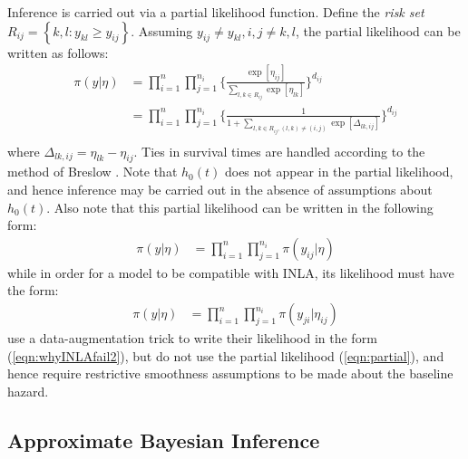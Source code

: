\documentclass[]{article}
\begin{document}
Inference is carried out via a partial likelihood function. Define the \textit{risk set} $R_{ij} = \left\{k,l : y_{kl} \geq y_{ij}\right\}$. Assuming $y_{ij} \neq y_{kl}, i,j \neq k,l$, the partial likelihood can be written as follows: 
\begin{equation}\begin{aligned}\label{eqn:partial}
\pi(y|\eta) &= \prod_{i=1}^{n}\prod_{j=1}^{n_{i}} \bigg\{\frac{\exp[\eta_{ij}]}{{\sum_{l,k\in R_{ij}}^{}\exp[\eta_{lk}]}}\bigg \}^{d_{ij}} \\
&= \prod_{i=1}^{n}\prod_{j=1}^{n_{i}} \bigg\{\frac{1}{{1 + \sum_{l,k\in R_{ij} , (l,k) \neq (i,j)}\exp[\Delta_{lk,ij}]}}\bigg \}^{d_{ij}} \\
\end{aligned}\end{equation}
where $\Delta_{lk,ij} = \eta_{lk} - \eta_{ij}$. Ties in survival times are handled according to the method of Breslow \citep{Breslow}. Note that $h_{0}(t)$ does not appear in the partial likelihood, and hence inference may be carried out in the absence of assumptions about $h_{0}(t)$. Also note that this partial likelihood can be written in the following form:
\begin{equation}\begin{aligned}\label{eqn:whyINLAfail1}
\pi(y|\eta) &= \prod_{i=1}^{n}\prod_{j=1}^{n_{i}} \pi(y_{ij}|\eta)
\end{aligned}\end{equation}
while in order for a model to be compatible with INLA, its likelihood must have the form:
\begin{equation}\begin{aligned}\label{eqn:whyINLAfail2}
\pi(y|\eta) &= \prod_{i=1}^{n}\prod_{j=1}^{n_{i}} \pi(y_{ji}|\eta_{ij})
\end{aligned}\end{equation}
\citet{inlacoxph} use a data-augmentation trick to write their likelihood in the form (\ref{eqn:whyINLAfail2}), but do not use the partial likelihood (\ref{eqn:partial}), and hence require restrictive smoothness assumptions to be made about the baseline hazard.

\subsection{Approximate Bayesian Inference}
\end{document}
